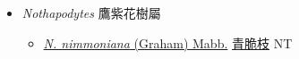 
  \begin{itemize}
 \item[] \textit{Nothapodytes} 鷹紫花樹屬
                    
  \begin{itemize}
        \item[] \href{http://www.theplantlist.org/tpl1.1/search?q=Nothapodytes+nimmoniana}{\textit{N. nimmoniana} (Graham) Mabb.}   \href{\detokenize{http://taibnet.sinica.edu.tw/chi/taibnet_species_list.php?T2=青脆枝&T2_new_value=true&fr=y}}{青脆枝} NT
  \end{itemize}
  \end{itemize}
